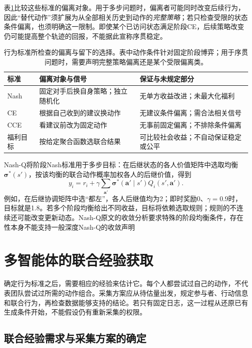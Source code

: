 表\ref{tab:rl-multi-agent-equilibria}比较这些标准的偏离对象。用于多步问题时，偏离者可能同时改变后续行为，因此“替代动作”须扩展为从全部相关历史到动作的\emph{完整策略}；若只检查受限的状态条件偏离，也须明确这一限制。即使某个已访问状态满足阶段CE，后续策略改变仍可能提高整个轨迹的回报，不能据此宣称序贯稳定。

\begin{table}[htbp]
 \centering
 \begin{tabularx}{\linewidth}{@{}l >{\raggedright\arraybackslash}X >{\raggedright\arraybackslash}X@{}}
 \toprule
 标准 & 偏离对象与信号 & 保证与未规定部分\\
 \midrule
 Nash & 固定对手后换自身策略；独立随机化 & 无单方收益改进；未最大化福利\\
 CE & 根据自己收到的建议换动作 & 无建议条件偏离；需合法相关信号\\
 CCE & 看建议前改为固定动作 & 无事前固定偏离；不排除条件偏离\\
 福利目标 & 按给定聚合函数选联合结果 & 可比较社会收益；不自动保证稳定或公平\\
 \bottomrule
 \end{tabularx}
 \caption{行为标准所检查的偏离与留下的选择。表中动作条件针对固定阶段博弈；用于序贯问题时，需要声明完整策略偏离还是某个受限偏离类。}
 \label{tab:rl-multi-agent-equilibria}
\end{table}

Nash-Q将阶段Nash标准用于多步目标：在后继状态的各人价值矩阵中选取均衡$\bm\sigma^*(s')$，按该均衡的联合动作概率加权各人的后继价值，得到
\[
 y_i=r_i+\gamma\sum_{\bm a'}\bm\sigma^*(\bm a'\mid s')
                         Q_i(s',\bm a').
\]
例如，在后继协调矩阵中选“都左”，各人后继值均为2；即时奖励0、$\gamma=0.9$时，目标就是1.8。若多个阶段均衡给出不同收益，目标将依赖选取规则；规则的不连续还可能改变更新动态。Nash-Q原文的收敛分析要求特殊的阶段均衡条件，存在性本身不能支持一般深度Nash-Q的收敛声明

\section{多智能体的联合经验获取}
\label{sec:rl-multi-agent-data}

确定行为标准之后，需要相应的经验来估计它。每个人都尝试过自己的动作，不代表团队尝试过所需的动作组合。采集方案应从待估量出发，规定参与者、行动信息和联合行为，再检查数据能够支持的结论。若只有固定日志，这一过程从还原已有生成条件开始，不能假设仍有重新采集的权限。

\subsection{联合经验需求与采集方案的确定}
\label{sec:rl-multi-agent-collection-plan}

